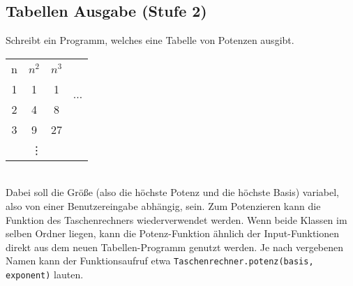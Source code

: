 \subsection{Tabellen Ausgabe (Stufe 2)}
Schreibt ein Programm, welches eine Tabelle von Potenzen ausgibt.
\\\begin{tabular}{|c|c|c|c}\cline{1-3}
    n & $n^2$ & $n^3$          & \multirow{4}{*}{$\cdots$} \\\cline{1-3}
    1 & 1     & 1              &                           \\\cline{1-3}
    2 & 4     & 8              &                           \\\cline{1-3}
    3 & 9     & 27             &                           \\\cline{1-3}
    \multicolumn{3}{c}{\vdots}
\end{tabular}
\\Dabei soll die Größe (also die höchste Potenz und die höchste Basis) variabel,
also von einer Benutzereingabe abhängig, sein. Zum Potenzieren kann die Funktion
des Taschenrechners wiederverwendet werden. Wenn beide Klassen im selben Ordner
liegen, kann die Potenz-Funktion ähnlich der Input-Funktionen direkt aus dem
neuen Tabellen-Programm genutzt werden. Je nach vergebenen Namen kann der
Funktionsaufruf etwa \lstinline{Taschenrechner.potenz(basis, exponent)} lauten.
